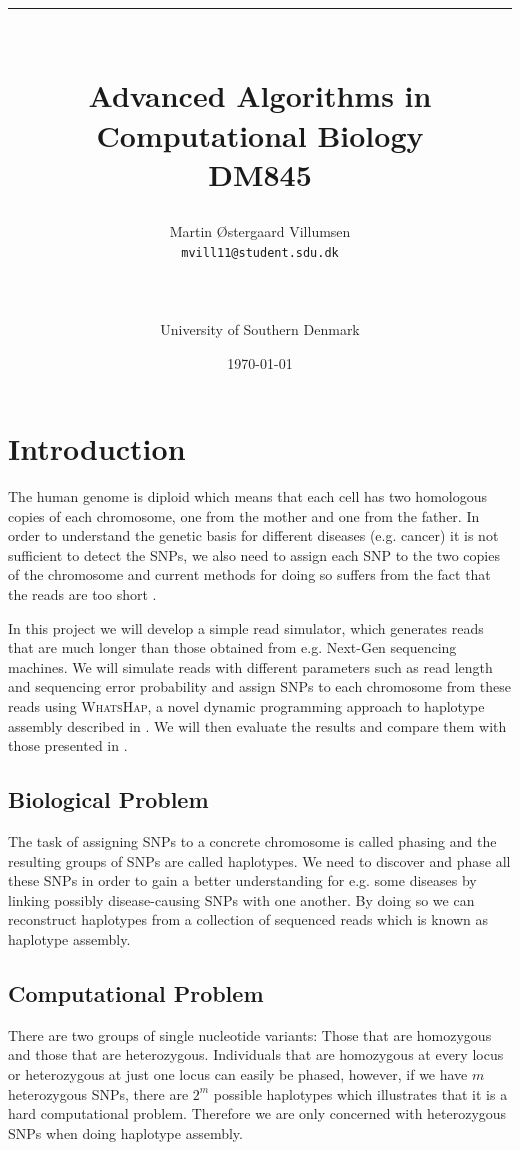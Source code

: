\documentclass[10pt,a4paper]{article}
\title{\rule{12.5cm}{0.5mm}\\Advanced Algorithms in Computational Biology\\DM845}
\author{Martin Østergaard Villumsen\\\texttt{mvill11@student.sdu.dk}\\\rule{6.5cm}{0.5mm}\\University of Southern Denmark\\}
\date{\today}
\begin{document}
\maketitle
\newpage
\tableofcontents
\newpage
\section{Introduction}
The human genome is diploid which means that each cell has two homologous copies of each chromosome, one from the mother and one from the father. In order to understand the genetic basis for different diseases (e.g. cancer) it is not sufficient to detect the SNPs, we also need to assign each SNP to the two copies of the chromosome and current methods for doing so suffers from the fact that the reads are too short \cite{whatshap}.

In this project we will develop a simple read simulator, which generates reads that are much longer than those obtained from e.g. Next-Gen sequencing machines. We will simulate reads with different parameters such as read length and sequencing error probability and assign SNPs to each chromosome from these reads using \textsc{WhatsHap}, a novel dynamic programming approach to haplotype assembly described in \cite{whatshap}. We will then evaluate the results and compare them with those presented in \cite{whatshap}.

\subsection{Biological Problem}
The task of assigning SNPs to a concrete chromosome is called phasing and the resulting groups of SNPs are called haplotypes. We need to discover and phase all these SNPs in order to gain a better understanding for e.g. some diseases by linking possibly disease-causing SNPs with one another. By doing so we can reconstruct haplotypes from a collection of sequenced reads which is known as haplotype assembly.

\subsection{Computational Problem}
There are two groups of single nucleotide variants: Those that are homozygous and those that are heterozygous. Individuals that are homozygous at every locus or heterozygous at just one locus can easily be phased, however, if we have $m$ heterozygous SNPs, there are $2^m$ possible haplotypes which illustrates that it is a hard computational problem. Therefore we are only concerned with heterozygous SNPs when doing haplotype assembly. 
\end{document}
